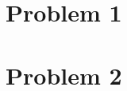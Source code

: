 \documentclass[sserif]{problemset}
\begin{document}
\maketitle

\section*{Problem 1}
\section*{Problem 2}
\end{document}

